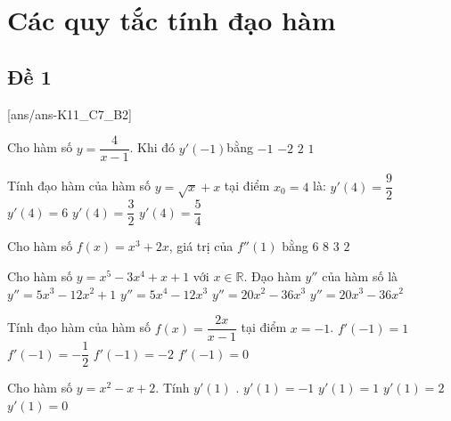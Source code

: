 \section{Các quy tắc tính đạo hàm}

\subsection{Đề 1}

[ans/ans-K11_C7_B2]
\caulc

\begin{ex}%
	Cho hàm số $ y=\dfrac{4}{x-1}$. Khi đó $y'\left(-1\right)$bằng
	\choice
	{\True $-1$}
	{$-2$}
	{$2$}
	{$1$}
\end{ex}

\begin{ex}%
	Tính đạo hàm của hàm số $y=\sqrt{x}+x$ tại điểm $x_0=4$ là:
	\choice
	{$y'(4)=\dfrac{9}{2}$}
	{$y'(4)=6$}
	{$y'(4)=\dfrac{3}{2}$}
	{\True $y'(4)=\dfrac{5}{4}$}
\end{ex}

\begin{ex}%
	Cho hàm số $ f(x)=x^3+2x$, giá trị của $f''(1)$ bằng
	\choice
	{\True $ 6$}
	{$ 8$}
	{$ 3$}
	{$ 2$}
\end{ex}

\begin{ex}%
	Cho hàm số $ y=x^5-3x^4+x+1$ với $ x\in\mathbb{R}$. Đạo hàm $y''$ của hàm số là
	\choice
	{$y''=5x^3-12x^2+1$}
	{$y''=5x^4-12x^3$}
	{$y''=20x^2-36x^3$}
	{\True $y''=20x^3-36x^2$}
\end{ex}

\begin{ex}%
	Tính đạo hàm của hàm số $ f(x)=\dfrac{2x}{x-1}$ tại điểm $ x=-1$.
	\choice
	{$ f'\left(-1\right)=1$}
	{\True $ f'\left(-1\right)=-\dfrac{1}{2}$}
	{$ f'\left(-1\right)=-2$}
	{$ f'\left(-1\right)=0$}
\end{ex}

\begin{ex}%
	Cho hàm số $y=x^2-x+2$. Tính $y'(1)$ .
	\choice
	{$y'(1)=-1$}
	{\True $y'(1)=1$}
	{$y'(1)=2$}
	{$ y'(1)=0$}
\end{ex}


